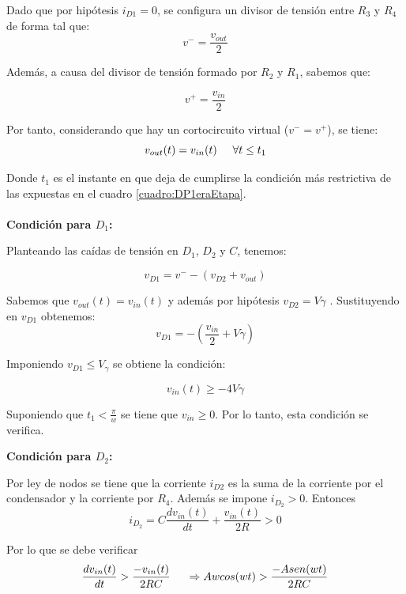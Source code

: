 Dado que por hipótesis $i_{D1}=0$, se configura un divisor de tensión entre $R_3$ y $R_4$ de forma tal que:
	$$ v^-=\frac{v_{out}}{2}$$

Además, a causa del divisor de tensión formado por $R_2$ y $R_1$, sabemos que:

$$v^+ = \frac{v_{in}}{2}$$

Por tanto, considerando que hay un cortocircuito virtual ($v^-=v^+$), se tiene:
\begin{equation}
v_{out}(t)= v_{in}(t) \hspace{0.5cm} \forall t\leq t_1
\label{eq:v_{out}}
\end{equation}

Donde $t_1$ es el instante en que deja de cumplirse la condición más restrictiva de las expuestas en el cuadro \ref{cuadro:DP1eraEtapa}.\\\\
{\large \bf Condición para $D_1$:}

Planteando las caídas de tensión en $D_1$, $D_2$ y $C$, tenemos:

$$v_{D1}= v ^- - (v_{D2}+ v_{out})$$

Sabemos que $v_{out}(t)=v_{in}(t)$ y además por hipótesis $v_{D2}=V\gamma$ . Sustituyendo en $v_{D1}$ obtenemos:
$$v_{D1}=-\left(\frac{v_{in}}{2} +V\gamma \right)$$

Imponiendo $v_{D1} \leq V_\gamma $ se obtiene la condición:

\begin{equation}
 v_{in}(t) \geq -4V\gamma 
 \label{eq:d1}
\end{equation}

Suponiendo que $t_1<\frac{\pi}{w}$ se tiene que $v_{in}\geq 0$. Por lo tanto, esta condición se verifica.

{\large \bf Condición para $D_2$:}

Por ley de nodos se tiene que la corriente $i_{D2}$ es la suma de la corriente por el condensador y la corriente por  $R_{4}$. 
Además se impone $i_{D_{2}}>0$. Entonces
\begin{equation*}
      i_{D_{2}} = C \frac{dv_{in}(t)}{dt} + \frac{v_{in}(t)}{2R}  > 0
\end{equation*}

Por lo que se debe verificar
\begin{equation*}
\frac{dv_{in}(t)}{dt} > \frac{-v_{in}(t)}{2RC} \hspace{0.5cm} \Rightarrow Awcos(wt) > \frac{-Asen(wt)}{2RC}
\end{equation*}

